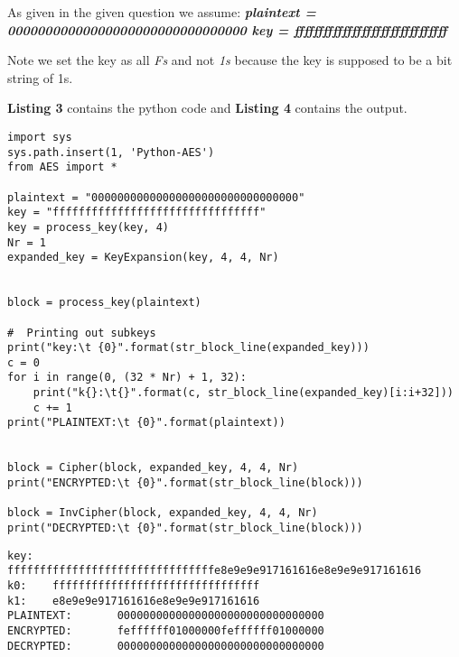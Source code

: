 \documentclass[10pt,a4paper,oneside]{article}
\begin{document}
As given in the given question we assume:\newline
\textit{
\textbf{
plaintext = 00000000000000000000000000000000\newline
key = ffffffffffffffffffffffffffffffff\newline
}
}
\newline

Note we set the key as all \textit{Fs} and not \textit{1s} because the key is supposed to be a bit string of 1s.

\textbf{Listing 3} contains the python code and \textbf{Listing 4} contains the output.

\lstset{showstringspaces=false}
\begin{lstlisting}
import sys
sys.path.insert(1, 'Python-AES')
from AES import *

plaintext = "00000000000000000000000000000000"
key = "ffffffffffffffffffffffffffffffff"
key = process_key(key, 4)
Nr = 1
expanded_key = KeyExpansion(key, 4, 4, Nr)


block = process_key(plaintext)

#  Printing out subkeys
print("key:\t {0}".format(str_block_line(expanded_key)))
c = 0
for i in range(0, (32 * Nr) + 1, 32):
    print("k{}:\t{}".format(c, str_block_line(expanded_key)[i:i+32]))
    c += 1
print("PLAINTEXT:\t {0}".format(plaintext))


block = Cipher(block, expanded_key, 4, 4, Nr)
print("ENCRYPTED:\t {0}".format(str_block_line(block)))

block = InvCipher(block, expanded_key, 4, 4, Nr)
print("DECRYPTED:\t {0}".format(str_block_line(block)))
\end{lstlisting}

\begin{lstlisting}
key:   ffffffffffffffffffffffffffffffffe8e9e9e917161616e8e9e9e917161616
k0:    ffffffffffffffffffffffffffffffff
k1:    e8e9e9e917161616e8e9e9e917161616
PLAINTEXT:       00000000000000000000000000000000
ENCRYPTED:       feffffff01000000feffffff01000000
DECRYPTED:       00000000000000000000000000000000
\end{lstlisting}
\end{document}
